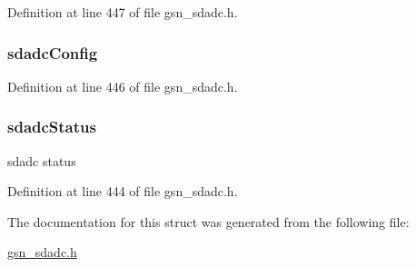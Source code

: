 Definition at line 447 of file gsn\_\-sdadc.h.

\hypertarget{a00214_adbf974f7628c19791be5104a729c530f}{
\subsubsection[{sdadcConfig}]{ {\bf sdadcConfig}}}
\label{a00214_adbf974f7628c19791be5104a729c530f}


Definition at line 446 of file gsn\_\-sdadc.h.

\hypertarget{a00214_a4be1cc896c0c806c1ceda03b00446e5d}{
\subsubsection[{sdadcStatus}]{ {\bf sdadcStatus}}}
\label{a00214_a4be1cc896c0c806c1ceda03b00446e5d}
sdadc status 

Definition at line 444 of file gsn\_\-sdadc.h.



The documentation for this struct was generated from the following file:\begin{DoxyCompactItemize}
\item 
\hyperlink{a00583}{gsn\_\-sdadc.h}\end{DoxyCompactItemize}
